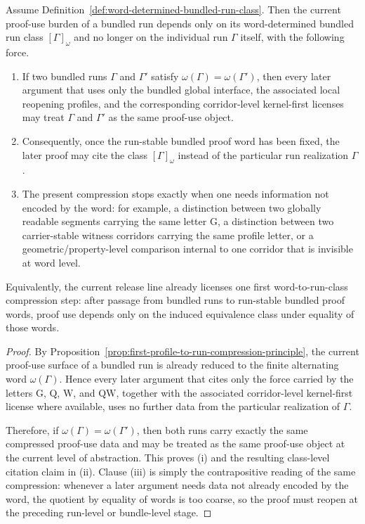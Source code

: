\begin{proposition}
\label{prop:first-word-to-run-class-compression-principle}
Assume Definition~\ref{def:word-determined-bundled-run-class}. Then the current proof-use burden of a bundled run depends only on its word-determined bundled run class $[\Gamma]_{\omega}$ and no longer on the individual run $\Gamma$ itself, with the following force.
\begin{enumerate}[leftmargin=2em,label=(\roman*)]
\item If two bundled runs $\Gamma$ and $\Gamma'$ satisfy $\omega(\Gamma)=\omega(\Gamma')$, then every later argument that uses only the bundled global interface, the associated local reopening profiles, and the corresponding corridor-level kernel-first licenses may treat $\Gamma$ and $\Gamma'$ as the same proof-use object.
\item Consequently, once the run-stable bundled proof word has been fixed, the later proof may cite the class $[\Gamma]_{\omega}$ instead of the particular run realization $\Gamma$.
\item The present compression stops exactly when one needs information not encoded by the word: for example, a distinction between two globally readable segments carrying the same letter $\mathrm G$, a distinction between two carrier-stable witness corridors carrying the same profile letter, or a geometric/property-level comparison internal to one corridor that is invisible at word level.
\end{enumerate}
Equivalently, the current release line already licenses one first word-to-run-class compression step: after passage from bundled runs to run-stable bundled proof words, proof use depends only on the induced equivalence class under equality of those words.
\end{proposition}

\begin{proof}
By Proposition~\ref{prop:first-profile-to-run-compression-principle}, the current proof-use surface of a bundled run is already reduced to the finite alternating word $\omega(\Gamma)$. Hence every later argument that cites only the force carried by the letters $\mathrm G$, $\mathrm Q$, $\mathrm W$, and $\mathrm{QW}$, together with the associated corridor-level kernel-first license where available, uses no further data from the particular realization of $\Gamma$.

Therefore, if $\omega(\Gamma)=\omega(\Gamma')$, then both runs carry exactly the same compressed proof-use data and may be treated as the same proof-use object at the current level of abstraction. This proves (i) and the resulting class-level citation claim in (ii). Clause (iii) is simply the contrapositive reading of the same compression: whenever a later argument needs data not already encoded by the word, the quotient by equality of words is too coarse, so the proof must reopen at the preceding run-level or bundle-level stage.
\end{proof}

